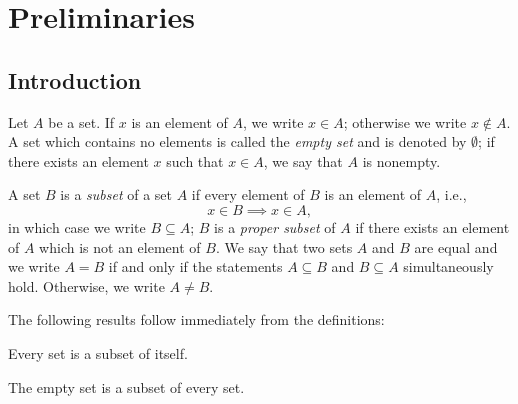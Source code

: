 \chapter{Preliminaries}

\section*{Introduction}

\begin{sectionthm}
    Let \(A\) be a set. If \(x\) is an element of \(A\), we write \(x \in A\); otherwise we write \(x \notin A\). A set which contains no elements is called the \emph{empty set} and is denoted by \(\emptyset\); if there exists an element \(x\) such that \(x \in A\), we say that \(A\) is nonempty.

    A set \(B\) is a \emph{subset} of a set \(A\) if every element of \(B\) is an element of \(A\), i.e.,
    \[
        x \in B \implies x \in A,
    \]
    in which case we write \(B \subseteq A\); \(B\) is a \emph{proper subset} of \(A\) if there exists an element of \(A\) which is not an element of \(B\). We say that two sets \(A\) and \(B\) are equal and we write \(A = B\) if and only if the statements \(A \subseteq B\) and \(B \subseteq A\) simultaneously hold. Otherwise, we write \(A \neq B\).

    The following results follow immediately from the definitions:
\end{sectionthm}

\begin{theorem}
    Every set is a subset of itself.
\end{theorem}

\begin{theorem}
    The empty set is a subset of every set.
\end{theorem}

